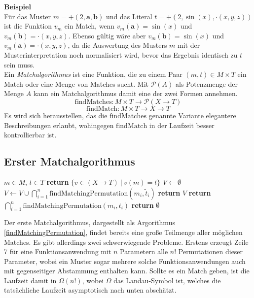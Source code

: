 \documentclass{scrartcl}
\numberwithin{figure}{section} %
\theoremstyle{definition} %
\begin{document}
\textbf{Beispiel}\\
Für das Muster $m = +(2, \mathbf a, \mathbf b)$ und das Literal $t = +(2, \sin(x), \cdot(x, y, z))$ ist die Funktion $v_m$ ein Match, wenn $v_m(\mathbf a) = \sin(x)$ und $v_m(\mathbf b) = \cdot(x, y, z)$. Ebenso gültig wäre aber $v_m(\mathbf b) = \sin(x)$ und $v_m(\mathbf a) = \cdot(x, y, z)$, da die Auswertung des Musters $m$ mit der Musterinterpretation noch normalisiert wird, bevor das Ergebnis identisch zu $t$ sein muss.\\

Ein \emph{Matchalgorithmus} ist eine Funktion, die zu einem Paar $(m, t) \in M \times T$ ein Match oder eine Menge von Matches sucht. Mit $\mathcal{P}(A)$ als Potenzmenge der Menge $A$ kann ein Matchalgorithmus damit eine der zwei Formen annehmen.
$$\mathrm{findMatches} \colon M \times T \rightarrow \mathcal{P}(X \rightarrow T)$$
$$\mathrm{findMatch} \colon M \times T \rightarrow X \rightarrow T$$
Es wird sich herausstellen, das die $\mathrm{findMatches}$ genannte Variante elegantere Beschreibungen erlaubt, wohingegen $\mathrm{findMatch}$ in der Laufzeit besser kontrollierbar ist.

\subsection{Erster Matchalgorithmus}

\begin{algorithm}
\caption{$\mathrm{findMatchingPermutation} \colon M \times T \rightarrow \mathcal{P}(X \rightarrow T)$}\label{findMatchingPermutation}
\begin{algorithmic}[1] %
\Require $m \in M$, $t \in T$
	\State \textbf{return} $\{v \in (X \rightarrow T) ~|~ v(m) = t\}$ 
\EndIf
{}
		\State $V \leftarrow \emptyset$
			\State $V \leftarrow V \cup \bigcap_{i = 1}^n {\mathrm{findMatchingPermutation}(m_i, \tilde t_i)}$
		\EndFor
		\State \textbf{return} $V$
	\Else
		\State \textbf{return} $\bigcap_{i = 1}^n {\mathrm{findMatchingPermutation}(m_i, t_i)}$
	\EndIf
\EndIf
\State \textbf{return} $\emptyset$
\end{algorithmic}
\end{algorithm}

Der erste Matchalgorithmus, dargestellt als Argorithmus \ref{findMatchingPermutation}, findet bereits eine große Teilmenge aller möglichen Matches. Es gibt allerdings zwei schwerwiegende Probleme. Erstens erzeugt Zeile 7 für eine Funktionsanwendung mit $n$ Parametern alle $n!$ Permutationen dieser Parameter, wobei ein Muster sogar mehrere solche Funktionsanwendungen auch mit gegenseitiger Abstammung enthalten kann. Sollte es ein Match geben, ist die Laufzeit damit in $\Omega(n!)$, wobei  $\Omega$ das Landau-Symbol ist, welches die tatsächliche Laufzeit asymptotisch nach unten abschätzt.
\end{document}
